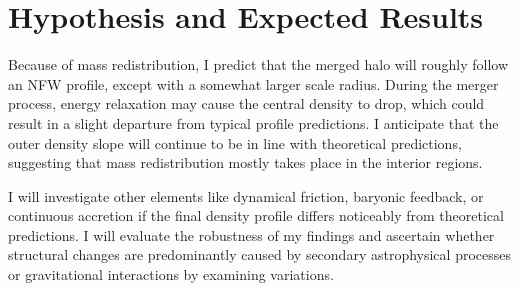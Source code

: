 \documentclass{mnras}
\begin{document}
\section{Hypothesis and Expected Results}

Because of mass redistribution, I predict that the merged halo will roughly follow an NFW profile, except with a somewhat larger scale radius. During the merger process, energy relaxation may cause the central density to drop, which could result in a slight departure from typical profile predictions. I anticipate that the outer density slope will continue to be in line with theoretical predictions, suggesting that mass redistribution mostly takes place in the interior regions.

I will investigate other elements like dynamical friction, baryonic feedback, or continuous accretion if the final density profile differs noticeably from theoretical predictions. I will evaluate the robustness of my findings and ascertain whether structural changes are predominantly caused by secondary astrophysical processes or gravitational interactions by examining variations.



\end{document}
